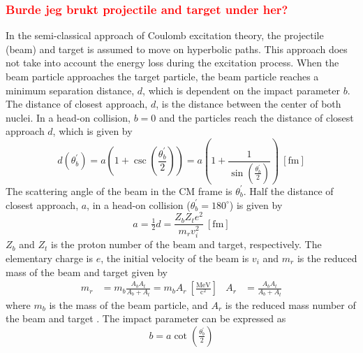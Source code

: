 \documentclass[twoside,english]{uiofysmaster/uiofysmaster}
\begin{document}
\subsubsection*{\textcolor{red}{Burde jeg brukt projectile and target under her?}}

In the semi-classical approach of Coulomb excitation theory, the projectile (beam) and target is assumed to move on hyperbolic paths. 
This approach does not take into account the energy loss during the excitation process.
When the beam particle approaches the target particle, the beam particle reaches a minimum separation distance, $d$, which is dependent on the impact parameter $b$. 
The distance of closest approach, $d$, is the distance between the center of both nuclei. 
In a head-on collision, $b = 0$ and the particles reach the distance of closest approach $d$, which is given by
\begin{equation}
	d\left( \theta_b^{'} \right) = a \left( 1 + \csc \left( \frac{\theta_b^{'}}{2} \right) \right) = a \left( 1 + \frac{1}{\sin \left( \frac{\theta_b^{'}}{2} \right)} \right) ~[\text{fm}]
\end{equation}
The scattering angle of the beam in the CM frame is $\theta_b^{'}$.
Half the distance of closest approach, $a$, in a head-on collision ($\theta_b^{'} = 180^\circ$) is given by
\begin{equation}
	 a = \tfrac{1}{2} d = \frac{Z_b Z_t e^2}{m_r v_i^2} ~[\text{fm}]
\end{equation}
$Z_b$ and $Z_t$ is the proton number of the beam and target, respectively. 
The elementary charge is $e$, the initial velocity of the beam is $v_i$ and $m_r$ is the reduced mass of the beam and target given by
\begin{align}
	 m_r &= m_b \frac{A_b A_t}{A_b + A_t} = m_b A_r  ~\left[ \tfrac{\text{MeV}}{\text{c}^2} \right]
	 &
	 A_r &= \frac{A_b A_t}{A_b + A_t}
\end{align}
where $m_b$ is the mass of the beam particle, and $A_r$ is the reduced mass number of the beam and target \cite{RBass, EE-Coulex}. 
The impact parameter can be expressed as
\begin{equation}
	b = a \cot \left( \tfrac{\theta_b^{'}}{2} \right)
\end{equation}
\end{document}
